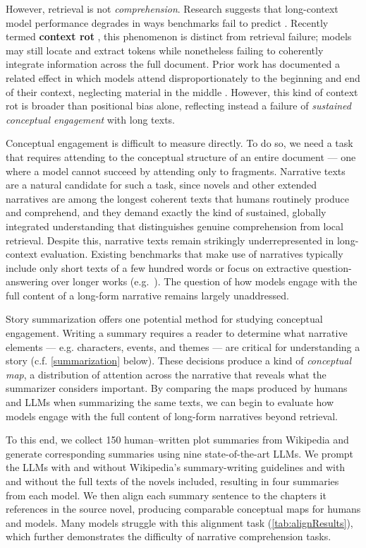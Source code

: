 \documentclass{article} %
\begin{document}
However, retrieval is not \textit{comprehension}. Research suggests that long-context model performance degrades in ways benchmarks fail to predict \citep{du-etal-2025-context}. Recently termed \textbf{context rot} \citep{hong2025context}, this phenomenon is distinct from retrieval failure; models may still locate and extract tokens while nonetheless failing to coherently integrate information across the full document. Prior work has documented a related effect in which models attend disproportionately to the beginning and end of their context, neglecting material in the middle \citep{liu-etal-2024-lost}. However, this kind of context rot is broader than positional bias alone, reflecting instead a failure of \textit{sustained conceptual engagement} with long texts.

Conceptual engagement is difficult to measure directly. To do so, we need a task that requires attending to the conceptual structure of an entire document --- one where a model cannot succeed by attending only to fragments. Narrative texts are a natural candidate for such a task, since novels and other extended narratives are among the longest coherent texts that humans routinely produce and comprehend, and they demand exactly the kind of sustained, globally integrated understanding that distinguishes genuine comprehension from local retrieval. Despite this, narrative texts remain strikingly underrepresented in long-context evaluation. Existing benchmarks that make use of narratives typically include only short texts of a few hundred words or focus on extractive question-answering over longer works (e.g.\ \cite{kocisky-etal-2018-narrativeqa,bonomo-etal-2025-literaryqa}). The question of how models engage with the full content of a long-form narrative remains largely unaddressed.

Story summarization offers one potential method for studying conceptual engagement. Writing a summary requires a reader to determine what narrative elements --- e.g. characters, events, and themes --- are critical for understanding a story (c.f. \cref{summarization} below). These decisions produce a kind of \textit{conceptual map}, a distribution of attention across the narrative that reveals what the summarizer considers important. By comparing the maps produced by humans and LLMs when summarizing the same texts, we can begin to evaluate how models engage with the full content of long-form narratives beyond retrieval.

To this end, we collect 150 human--written plot summaries from Wikipedia and generate corresponding summaries using nine state-of-the-art LLMs. We prompt the LLMs with and without Wikipedia's summary-writing guidelines and with and without the full texts of the novels included, resulting in four summaries from each model. We then align each summary sentence to the chapters it references in the source novel, producing comparable conceptual maps for humans and models. Many models struggle with this alignment task (\cref{tab:alignResults}), which further demonstrates the difficulty of narrative comprehension tasks.
\end{document}
